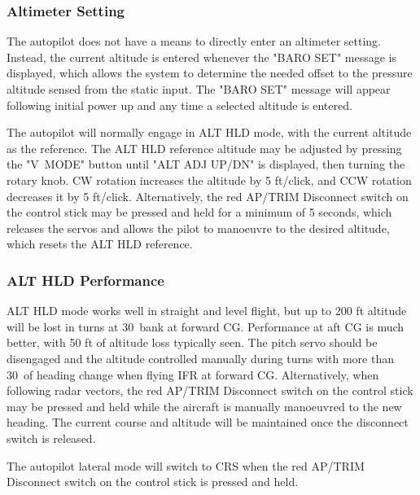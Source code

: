 \subsubsection{Altimeter Setting} The autopilot does not have a means to directly enter an altimeter setting. Instead, the current altitude is entered whenever the "BARO SET" message is displayed, which allows the system to determine the needed offset to the pressure altitude sensed from the static input. The "BARO SET" message will appear following initial power up and any time a selected altitude is entered.

The autopilot will normally engage in ALT HLD mode, with the current altitude as the reference. The ALT HLD reference altitude may be adjusted by pressing the "V~MODE" button until "ALT ADJ UP/DN" is displayed, then turning the rotary knob. CW rotation increases the altitude by 5 ft/click, and CCW rotation decreases it by 5 ft/click. Alternatively, the red AP/TRIM Disconnect switch on the control stick may be pressed and held for a minimum of 5 seconds, which releases the servos and allows the pilot to manoeuvre to the desired altitude, which resets the ALT HLD reference.

\subsubsection{ALT HLD Performance} ALT HLD mode works well in straight and level flight, but up to 200 ft altitude will be lost in turns at 30\textdegree \ bank at forward CG. Performance at aft CG is much better, with 50 ft of altitude loss typically seen. The pitch servo should be disengaged and the altitude controlled manually during turns with more than 30\textdegree \ of heading change when flying IFR at forward CG. Alternatively, when following radar vectors, the red AP/TRIM Disconnect switch on the control stick may be pressed and held while the aircraft is manually manoeuvred to the new heading. The current course and altitude will be maintained once the disconnect switch is released.

\begin{Note}
  The autopilot lateral mode will switch to CRS when the red AP/TRIM Disconnect switch on the control stick is pressed and held.
\end{Note}
\cleardoublepage
